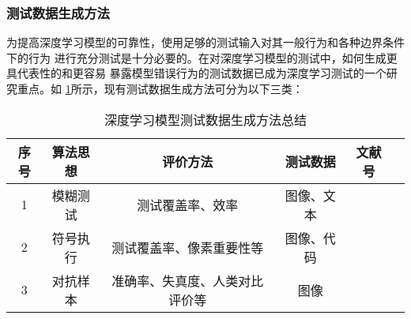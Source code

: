 \subsubsection{测试数据生成方法}

为提高深度学习模型的可靠性，使用足够的测试输入对其一般行为和各种边界条件下的行为
进行充分测试是十分必要的。在对深度学习模型的测试中，如何生成更具代表性的和更容易
暴露模型错误行为的测试数据已成为深度学习测试的一个研究重点。如
\cref{tab:testingDataGen}所示，现有测试数据生成方法可分为以下三类：

\begin{table}[htp]
	\renewcommand\arraystretch{1.5}
	\small
	\centering
	\caption{深度学习模型测试数据生成方法总结}
	\label{tab:testingDataGen}
	\begin{tabular}{cccccc}
		\toprule
		\textbf{序号} & \textbf{算法思想} & \textbf{评价方法}               & \textbf{测试数据} & \textbf{文献号}             \\
		\midrule
		1             & 模糊测试          & 测试覆盖率、效率 & 图像、文本 & \cite{Odena2019TensorFuzz}\cite{Guo2018DLFuzz}\cite{xie2019coverage} \\
		2             & 符号执行          & 测试覆盖率、像素重要性等                              & 图像、代码              & \cite{Gopinath2018Symbolic}\cite{Sun2018Concolic} \\
		3             & 对抗样本          & 准确率、失真度、人类对比评价等 & 图像 & \cite{Xiao2018Spatially}\cite{Wicker2018FeatureGuided}\cite{He2018Decision} \\
		\bottomrule
	\end{tabular}
\end{table}


